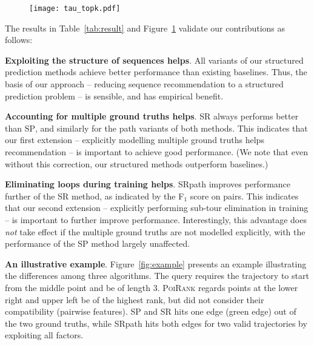 


\begin{figure}[!t]
		\centering
		\texttt{[image: tau\_topk.pdf]}
	    \label{fig:topk}
	    \vspace{-0.2in}
\end{figure}

The results in Table~\ref{tab:result} and Figure~\ref{fig:topk} validate our contributions as follows:

\textbf{Exploiting the structure of sequences helps}.
All variants of our structured prediction methods achieve better performance than existing baselines.
Thus, the basis of our approach -- reducing sequence recommendation to a structured prediction problem -- is sensible, and has empirical benefit.

\textbf{Accounting for multiple ground truths helps}.
\textsc{SR} always performs better than \textsc{SP},
and similarly for the {\sc path} variants of both methods.
This indicates that our first extension -- explicitly modelling multiple ground truths helps recommendation -- is important to achieve good performance.
(We note that even without this correction, our structured methods outperform baselines.)

\textbf{Eliminating loops during training helps}.
{\sc SRpath} improves performance further of the {\sc SR} method,
as indicated by the F$_1$ score on pairs.
This indicates that our second extension -- explicitly performing sub-tour elimination in training -- is important to further improve performance.
Interestingly,
this advantage does \emph{not} take effect if the multiple ground truths are not modelled explicitly,
with the performance of the {\sc SP} method largely unaffected.

\textbf{An illustrative example}. Figure~\ref{fig:example} presents an example illustrating the differences among three algorithms. The query requires the trajectory to start from the middle point and be of length 3.
\textsc{PoiRank} regards points at the lower right and upper left be of the highest rank, but did not consider their compatibility (\ie pairwise features). {\sc SP} and {\sc SR} hits one edge (green edge) out of the two ground truths, while {\sc SRpath} hits both edges for two valid trajectories by exploiting all factors.

